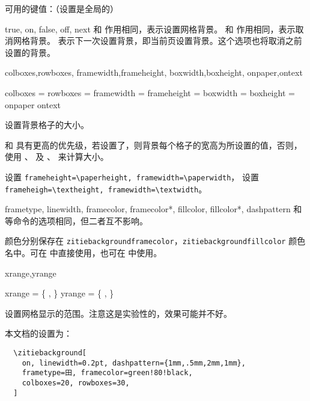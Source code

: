 \documentclass{ctxdoc}
\begin{document}
 可用的键值：（设置是全局的）

\begin{function}{true, on, false, off, next}
   和  作用相同，表示设置网格背景。
   和  作用相同，表示取消网格背景。
   表示下一次设置背景，即当前页设置背景。这个选项也将取消之前设置的背景。
\end{function}

\begin{function}{
  colboxes,rowboxes,
  framewidth,frameheight,
  boxwidth,boxheight,
  onpaper,ontext
}
  \begin{syntax}
    colboxes    =  
    rowboxes    =  
    framewidth  = 
    frameheight = 
    boxwidth    = 
    boxheight   = 
    onpaper
    ontext
  \end{syntax}
  设置背景格子的大小。

   和  具有更高的优先级，若设置了，则背景每个格子的宽高为所设置的值，否则，使用 、 及 、 来计算大小。

   设置 \verb|frameheight=\paperheight, framewidth=\paperwidth|，
   设置 \verb|frameheigh=\textheight, framewidth=\textwidth|。
\end{function}

\begin{function}{
  frametype,
  linewidth,
  framecolor,
  framecolor*,
  fillcolor,
  fillcolor*,
  dashpattern
}
  和  等命令的选项相同，但二者互不影响。

  颜色分别保存在 \verb|zitiebackgroundframecolor|，\verb|zitiebackgroundfillcolor| 颜色名中。可在  中直接使用，也可在  中使用。
\end{function}

\begin{function}{xrange,yrange}
  \begin{syntax}
    xrange = \{  ,  \}
    yrange = \{  ,  \}
  \end{syntax}
  设置网格显示的范围。注意这是实验性的，效果可能并不好。
\end{function}

本文档的设置为：
\begin{verbatim}
  \zitiebackground[
    on, linewidth=0.2pt, dashpattern={1mm,.5mm,2mm,1mm},
    frametype=田, framecolor=green!80!black,
    colboxes=20, rowboxes=30,
  ]
\end{verbatim}
\end{document}
